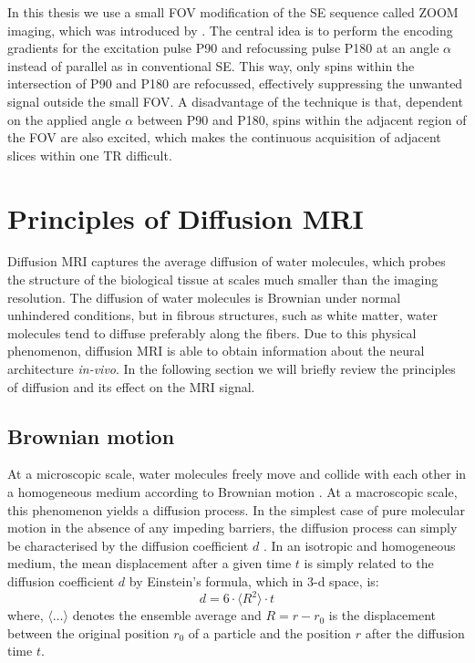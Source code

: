 In this thesis we use a small \gls{FOV} modification of the \gls{SE} sequence called \gls{ZOOM} imaging, which was introduced by \citet{Wheeler-Kingshott:2002,Wheeler-Kingshott:2002a}. The central idea is to perform the encoding gradients for the excitation pulse P90 and refocussing pulse P180 at an angle $\alpha$ instead of parallel as in conventional SE. This way, only spins within the intersection of P90 and P180 are refocussed, effectively suppressing the unwanted signal outside the small \gls{FOV}. A disadvantage of the technique is that, dependent on the applied angle $\alpha$ between P90 and P180, spins within the adjacent region of the \gls{FOV} are also excited, which makes the continuous acquisition of adjacent slices within one \gls{TR} difficult.


\section{Principles of Diffusion MRI}
Diffusion MRI captures the average diffusion of water molecules, which probes the structure of the biological tissue at scales much smaller than the imaging resolution. The diffusion of water molecules is Brownian under normal unhindered conditions, but in fibrous structures, such as white matter, water molecules tend to diffuse preferably along the fibers. Due to this physical phenomenon, diffusion MRI is able to obtain information about the neural architecture \textit{in-vivo}. In the following section we will briefly review the principles of diffusion and its effect on the MRI signal.

\subsection{Brownian motion}
At a microscopic scale, water molecules freely move and collide with each other in a homogeneous medium according to Brownian motion \citep{Brown:1828}. At a macroscopic scale, this phenomenon yields a diffusion process. In the simplest case of pure molecular motion in the absence of any impeding barriers, the diffusion process can simply be characterised by the diffusion coefficient $d$ \citep{Fick:1855}. In an isotropic and homogeneous medium, the mean displacement after a given time $t$ is simply related to the diffusion coefficient $d$ by Einstein's formula, which in 3-d space, is: 
\begin{equation}
	 d = 6 \cdot \langle R^2 \rangle \cdot t
	\label{eq:chapter2 einsteins formula}
\end{equation}
where, $\langle\dots\rangle$ denotes the ensemble average and $R = r - r_0$ is the displacement between the original position $r_0$ of a particle and the position $r$ after the diffusion time $t$. 

